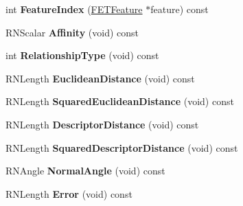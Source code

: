 \begin{DoxyCompactItemize}
\item 
int {\bfseries Feature\+Index} (\hyperlink{struct_f_e_t_feature}{F\+E\+T\+Feature} $\ast$feature) const \hypertarget{struct_f_e_t_correspondence_aca2e2e2a21a014df450df43425a6868c}{}\label{struct_f_e_t_correspondence_aca2e2e2a21a014df450df43425a6868c}

\item 
R\+N\+Scalar {\bfseries Affinity} (void) const \hypertarget{struct_f_e_t_correspondence_a9bb31d4806a064a5efc41e69e26b85d7}{}\label{struct_f_e_t_correspondence_a9bb31d4806a064a5efc41e69e26b85d7}

\item 
int {\bfseries Relationship\+Type} (void) const \hypertarget{struct_f_e_t_correspondence_a3af23d20ecd44156b39187ed167eac14}{}\label{struct_f_e_t_correspondence_a3af23d20ecd44156b39187ed167eac14}

\item 
R\+N\+Length {\bfseries Euclidean\+Distance} (void) const \hypertarget{struct_f_e_t_correspondence_ac19caba63498ffea581a4e22ebde032e}{}\label{struct_f_e_t_correspondence_ac19caba63498ffea581a4e22ebde032e}

\item 
R\+N\+Length {\bfseries Squared\+Euclidean\+Distance} (void) const \hypertarget{struct_f_e_t_correspondence_a6b56dc4b3d3773d0b2941f1d116134b1}{}\label{struct_f_e_t_correspondence_a6b56dc4b3d3773d0b2941f1d116134b1}

\item 
R\+N\+Length {\bfseries Descriptor\+Distance} (void) const \hypertarget{struct_f_e_t_correspondence_a6e9f308f49833660b3fe20fd74d0ab55}{}\label{struct_f_e_t_correspondence_a6e9f308f49833660b3fe20fd74d0ab55}

\item 
R\+N\+Length {\bfseries Squared\+Descriptor\+Distance} (void) const \hypertarget{struct_f_e_t_correspondence_a5542e5f1393fa314e4e468ba936abe5f}{}\label{struct_f_e_t_correspondence_a5542e5f1393fa314e4e468ba936abe5f}

\item 
R\+N\+Angle {\bfseries Normal\+Angle} (void) const \hypertarget{struct_f_e_t_correspondence_adf9b6955b7de1df0216d85d1d8046003}{}\label{struct_f_e_t_correspondence_adf9b6955b7de1df0216d85d1d8046003}

\item 
R\+N\+Length {\bfseries Error} (void) const \hypertarget{struct_f_e_t_correspondence_ae0794ae602f23b6b41edf9bb55ff4314}{}\label{struct_f_e_t_correspondence_ae0794ae602f23b6b41edf9bb55ff4314}


\end{DoxyCompactItemize}
